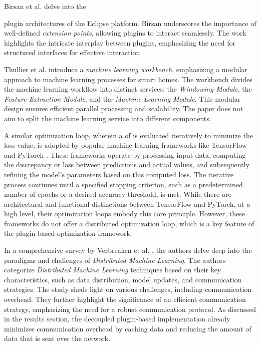\documentclass[
  a4paper,  %
  twoside,  %
  bibliography=totoc,
  headsepline,
  cleardoublepage=empty,
  parskip=half,
  draft=false
]{scrbook}
\begin{document}
Birsan et al. \cite{Birsan2005} delve into the {plugin architectures of the Eclipse platform.
Birsan underscores the importance of well-defined \emph{extension points}, allowing plugins to interact seamlessly.
The work highlights the intricate interplay between plugins, emphasizing the need for structured interfaces for effective interaction.

Thullier et al. \cite{Thullier2021} introduce a \emph{machine learning workbench}, emphasizing a modular approach to machine learning processes for smart homes.
The workbench divides the machine learning workflow into distinct services: the \emph{Windowing Module}, the \emph{Feature Extraction Module}, and the \emph{Machine Learning Module}.
This modular design ensures efficient parallel processing and scalability.
The paper does not aim to split the machine learning service into different components.

A similar optimization loop, wherein a \gls{of} is evaluated iteratively to minimize the loss value, is adopted by popular machine learning frameworks like TensorFlow \cite{Abadi2016} and PyTorch \cite{Paszke2019}.
These frameworks operate by processing input data, computing the discrepancy or loss between predictions and actual values, and subsequently refining the model's parameters based on this computed loss.
The iterative process continues until a specified stopping criterion, such as a predetermined number of epochs or a desired accuracy threshold, is met.
While there are architectural and functional distinctions between TensorFlow and PyTorch, at a high level, their optimization loops embody this core principle.
However, these frameworks do not offer a distributed optimization loop, which is a key feature of the plugin-based optimization framework.

In a comprehensive survey by Verbreaken et al. \cite{Verbraeken2020}, the authors delve deep into the paradigms and challenges of \emph{Distributed Machine Learning}.
The authors categorize \emph{Distributed Machine Learning} techniques based on their key characteristics, such as data distribution, model updates, and communication strategies.
The study sheds light on various challenges, including communication overhead.
They further highlight the significance of an efficient communication strategy, emphasizing the need for a robust communication protocol.
As discussed in the results section, the decoupled plugin-based implementation already minimizes communication overhead by caching data and reducing the amount of data that is sent over the network.

}
\end{document}
